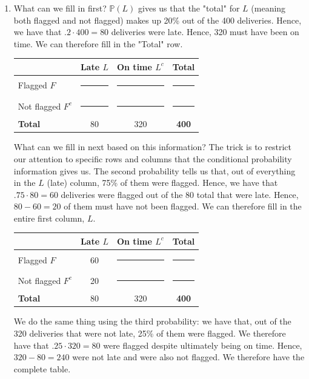 \documentclass[11pt,letterpaper]{article}
\newcommand{\blank}{\rule{1.4em}{0.35pt}}
\begin{document}
\begin{enumerate}[label=\alph*.]

\item What can we fill in first? $\mathbb P(L)$ gives us that the "total" for $L$ (meaning both flagged and not flagged) makes up 20\% out of the 400 deliveries. Hence, we have that $.2 \cdot 400 = 80$ deliveries were late. Hence, 320 must have been on time. We can therefore fill in the "Total" row.

\begin{center}
\small
\begin{tabular}{|l|c|c|c|}
\hline
 & \textbf{Late $L$} & \textbf{On time $L^c$} & \textbf{Total} \\ \hline
Flagged $F$ & \blank & \blank & \blank \\ \hline
Not flagged $F^c$ & \blank & \blank & \blank \\ \hline
\textbf{Total} & 80 & 320 & \textbf{400} \\ \hline
\end{tabular}
\end{center}

What can we fill in next based on this information? The trick is to restrict our attention to specific rows and columns that the conditional probability information gives us. The second probability tells us that, out of everything in the $L$ (late) column, 75\% of them were flagged. Hence, we have that $.75 \cdot 80 = 60$ deliveries were flagged out of the 80 total that were late. Hence, $80 - 60 = 20$ of them must have not been flagged. We can therefore fill in the entire first column, $L$.

\begin{center}
\small
\begin{tabular}{|l|c|c|c|}
\hline
 & \textbf{Late $L$} & \textbf{On time $L^c$} & \textbf{Total} \\ \hline
Flagged $F$ & 60 & \blank & \blank \\ \hline
Not flagged $F^c$ & 20 & \blank & \blank \\ \hline
\textbf{Total} & 80 & 320 & \textbf{400} \\ \hline
\end{tabular}
\end{center}

We do the same thing using the third probability: we have that, out of the 320 deliveries that were not late, 25\% of them were flagged. We therefore have that $.25 \cdot 320 = 80$ were flagged despite ultimately being on time. Hence, $320 - 80 = 240$ were not late and were also not flagged. We therefore have the complete table.


\end{enumerate}
\end{document}
